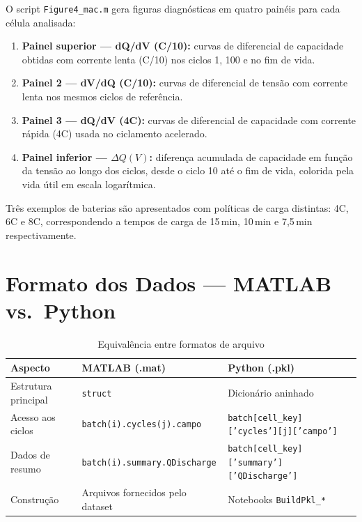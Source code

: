 \documentclass[12pt,a4paper]{article}
\begin{document}
O script \texttt{Figure4\_mac.m} gera figuras diagn\'{o}sticas em quatro pain\'{e}is
para cada c\'{e}lula analisada:

\begin{enumerate}
  \item \textbf{Painel superior --- dQ/dV (C/10):} curvas de diferencial de
    capacidade obtidas com corrente lenta (C/10) nos ciclos 1, 100 e no fim de
    vida.
  \item \textbf{Painel 2 --- dV/dQ (C/10):} curvas de diferencial de tens\~ao com
    corrente lenta nos mesmos ciclos de refer\^{e}ncia.
  \item \textbf{Painel 3 --- dQ/dV (4C):} curvas de diferencial de capacidade com
    corrente r\'{a}pida (4C) usada no ciclamento acelerado.
  \item \textbf{Painel inferior --- $\Delta Q(V)$:} diferen\c{c}a acumulada de
    capacidade em fun\c{c}\~ao da tens\~ao ao longo dos ciclos, desde o ciclo 10 at\'{e}
    o fim de vida, colorida pela vida \'{u}til em escala logar\'{i}tmica.
\end{enumerate}

Tr\^{e}s exemplos de baterias s\~ao apresentados com pol\'{i}ticas de carga distintas:
4C, 6C e 8C, correspondendo a tempos de carga de 15\,min, 10\,min e 7{,}5\,min
respectivamente.

\section{Formato dos Dados --- MATLAB vs.\ Python}

\begin{table}[H]
\centering
\caption{Equival\^{e}ncia entre formatos de arquivo}
\begin{tabular}{@{}lll@{}}
\toprule
\textbf{Aspecto} & \textbf{MATLAB (.mat)} & \textbf{Python (.pkl)} \\
\midrule
Estrutura principal & \texttt{struct}  & Dicion\'{a}rio aninhado \\
Acesso aos ciclos   & \texttt{batch(i).cycles(j).campo} &
  \texttt{batch[cell\_key]['cycles'][j]['campo']} \\
Dados de resumo     & \texttt{batch(i).summary.QDischarge} &
  \texttt{batch[cell\_key]['summary']['QDischarge']} \\
Constru\c{c}\~ao          & Arquivos fornecidos pelo dataset & Notebooks \texttt{BuildPkl\_*} \\
\bottomrule
\end{tabular}
\end{table}
\end{document}
